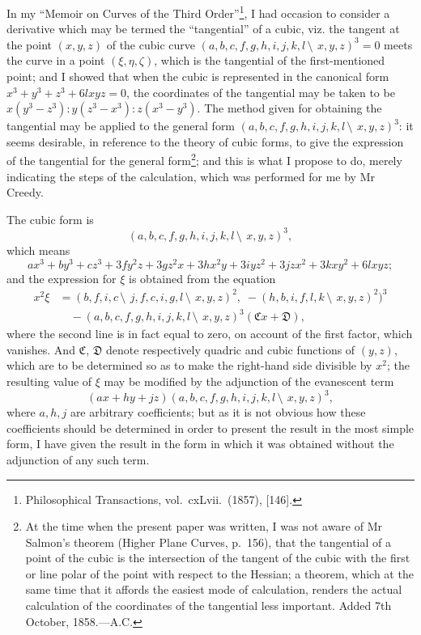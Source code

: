 \documentclass[11pt,a4paper]{book}
\begin{document}
\begin{center}
In my ``Memoir on Curves of the Third Order''\footnote{Philosophical Transactions, vol.~cxLvii.~(1857), [146].}, I had occasion to consider a derivative which may be termed the ``tangential'' of a cubic, viz. the tangent at the point $(x, y, z)$ of the cubic curve $(a, b, c, f, g, h, i, j, k, l\,\setminus\!\!\:\, x, y, z)^3 = 0$ meets the curve in a point $(\xi, \eta, \zeta)$, which is the tangential of the first-mentioned point; and I showed that when the cubic is represented in the canonical form $x^3 + y^3 + z^3 + 6lxyz = 0$, the coordinates of the tangential may be taken to be $x(y^3 - z^3) : y(z^3 - x^3) : z(x^3 - y^3)$. The method given for obtaining the tangential may be applied to the general form $(a, b, c, f, g, h, i, j, k, l\,\setminus\!\!\:\, x, y, z)^3$: it seems desirable, in reference to the theory of cubic forms, to give the expression of the tangential for the general form\footnote{At the time when the present paper was written, I was not aware of Mr Salmon's theorem (Higher Plane Curves, p.~156), that the tangential of a point of the cubic is the intersection of the tangent of the cubic with the first or line polar of the point with respect to the Hessian; a theorem, which at the same time that it affords the easiest mode of calculation, renders the actual calculation of the coordinates of the tangential less important. Added 7th October, 1858.---A.C.}; and this is what I propose to do, merely indicating the steps of the calculation, which was performed for me by Mr Creedy.

The cubic form is
\[
(a, b, c, f, g, h, i, j, k, l\,\setminus\!\!\:\, x, y, z)^3,
\]
which means
\[
ax^3 + by^3 + cz^3 + 3fy^2z + 3gz^2x + 3hx^2y + 3iyz^2 + 3jzx^2 + 3kxy^2 + 6lxyz;
\]
and the expression for $\xi$ is obtained from the equation
\begin{align*}
x^2\xi &= (b, f, i, c\,\setminus\!\!\:\, j, f, c, i, g, l\,\setminus\!\!\:\, x, y, z)^2,\; -(h, b, i, f, l, k\,\setminus\!\!\:\, x, y, z)^2)^3\\
&\quad - (a, b, c, f, g, h, i, j, k, l\,\setminus\!\!\:\, x, y, z)^3(\mathfrak{C}x + \mathfrak{D}),
\end{align*}
where the second line is in fact equal to zero, on account of the first factor, which vanishes. And $\mathfrak{C}$, $\mathfrak{D}$ denote respectively quadric and cubic functions of $(y, z)$, which are to be determined so as to make the right-hand side divisible by $x^2$; the resulting value of $\xi$ may be modified by the adjunction of the evanescent term
\[
(ax + hy + jz)(a, b, c, f, g, h, i, j, k, l\,\setminus\!\!\:\, x, y, z)^3,
\]
where $a, h, j$ are arbitrary coefficients; but as it is not obvious how these coefficients should be determined in order to present the result in the most simple form, I have given the result in the form in which it was obtained without the adjunction of any such term.


\end{center}
\end{document}
